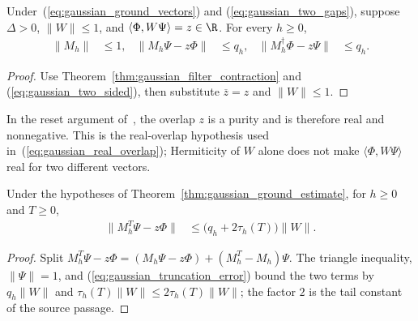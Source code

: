 \begin{theorem}
    \label{thm:gaussian_real_overlap}
    \leanok
    Under~(\ref{eq:gaussian_ground_vectors}) and
    (\ref{eq:gaussian_two_gaps}), suppose $\Delta>0$, $\|W\|\le1$,
    and $\langle\Phi,W\Psi\rangle=z\in\R$.
    For every $h\ge0$,
    \begin{align}
        \|M_h\|&\le1, &
        \|M_h\Psi-z\Phi\|&\le q_h, &
        \|M_h^\dagger\Phi-z\Psi\|&\le q_h.
        \label{eq:gaussian_real_overlap}
    \end{align}
\end{theorem}
\begin{proof}\leanok
    Use Theorem~\ref{thm:gaussian_filter_contraction} and
    (\ref{eq:gaussian_two_sided}), then substitute
    $\overline z=z$ and $\|W\|\le1$.
\end{proof}

In the reset argument of~\cite{OpenAI2026PolynomialPEPS}, the overlap
$z$ is a purity and is therefore real and nonnegative. This is the
real-overlap hypothesis used in~(\ref{eq:gaussian_real_overlap});
Hermiticity of $W$ alone does not make $\langle\Phi,W\Psi\rangle$
real for two different vectors.

\begin{theorem}
    \label{thm:gaussian_truncated_ground}
    \leanok
    Under the hypotheses of Theorem~\ref{thm:gaussian_ground_estimate},
    for $h\ge0$ and $T\ge0$,
    \begin{align}
        \|M_h^T\Psi-z\Phi\|
            &\le\bigl(q_h+2\tau_h(T)\bigr)\|W\|.
        \label{eq:gaussian_truncated_ground}
    \end{align}
\end{theorem}
\begin{proof}\leanok
    Split $M_h^T\Psi-z\Phi=(M_h\Psi-z\Phi)+(M_h^T-M_h)\Psi$.
    The triangle inequality, $\|\Psi\|=1$, and
    (\ref{eq:gaussian_truncation_error}) bound the two terms by
    $q_h\|W\|$ and $\tau_h(T)\|W\|\le2\tau_h(T)\|W\|$; the factor $2$ is the
    tail constant of the source passage.
\end{proof}

